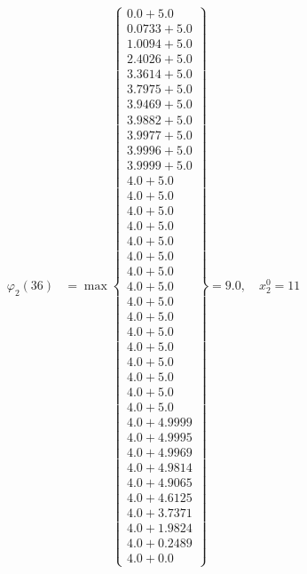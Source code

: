 \documentclass{article}
\begin{document}
\begin{align*}
\varphi_{2}(36) &= \max \left\{ \begin{array}{c}
0.0 + 5.0 \\
 0.0733 + 5.0 \\
 1.0094 + 5.0 \\
 2.4026 + 5.0 \\
 3.3614 + 5.0 \\
 3.7975 + 5.0 \\
 3.9469 + 5.0 \\
 3.9882 + 5.0 \\
 3.9977 + 5.0 \\
 3.9996 + 5.0 \\
 3.9999 + 5.0 \\
 4.0 + 5.0 \\
 4.0 + 5.0 \\
 4.0 + 5.0 \\
 4.0 + 5.0 \\
 4.0 + 5.0 \\
 4.0 + 5.0 \\
 4.0 + 5.0 \\
 4.0 + 5.0 \\
 4.0 + 5.0 \\
 4.0 + 5.0 \\
 4.0 + 5.0 \\
 4.0 + 5.0 \\
 4.0 + 5.0 \\
 4.0 + 5.0 \\
 4.0 + 5.0 \\
 4.0 + 5.0 \\
 4.0 + 4.9999 \\
 4.0 + 4.9995 \\
 4.0 + 4.9969 \\
 4.0 + 4.9814 \\
 4.0 + 4.9065 \\
 4.0 + 4.6125 \\
 4.0 + 3.7371 \\
 4.0 + 1.9824 \\
 4.0 + 0.2489 \\
 4.0 + 0.0
\end{array} \right\}=9.0, \quad x_{2}^0=11\\
  
 \\ 
\end{align*}
\end{document}
